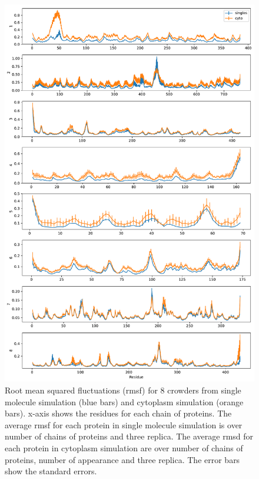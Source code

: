 \documentclass[journal=jacsat,manuscript=article]{achemso}
\begin{document}
\begin{figure}
\includegraphics[scale=0.6]{rmsf.pdf}
\caption{Root mean squared fluctuations (rmsf) for 8 crowders from single molecule simulation (blue bars) and cytoplasm simulation (orange bars). x-axis shows the residues for each chain of proteins. The average rmsf for each protein in single molecule simulation is over number of chains of proteins and three replica. The average rmsd for each protein in cytoplasm simulation are over number of chains of proteins, number of appearance and three replica. The error bars show the standard errors.}
\end{figure}
\end{document}
